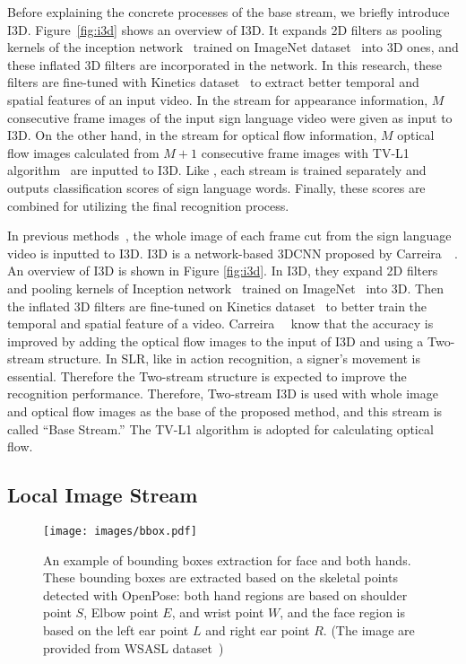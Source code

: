 \documentclass[journal]{IEEEtran}
\begin{document}
Before explaining the concrete processes of the base stream, we briefly introduce I3D. Figure~\ref{fig:i3d} shows an overview of I3D. It expands 2D filters as pooling kernels of the inception network~\cite{chris2014incep} trained on ImageNet dataset~\cite{olga2015imagenet} into 3D ones, and these inflated 3D filters are incorporated in the network.  In this research, these filters are fine-tuned with Kinetics dataset~\cite{joao2017i3d} to extract better temporal and spatial features of an input video. In the stream for appearance information, $M$ consecutive frame images of the input sign language video were given as input to I3D. On the other hand, in the stream for optical flow information, $M$ optical flow images calculated from $M+1$ consecutive frame images with TV-L1 algorithm~\cite{zach2007tvl1} are inputted to I3D. Like \cite{tu2018mscnn, bilen2018multi, zang2018multi}, each stream is trained separately and outputs classification scores of sign language words. Finally, these scores are combined for utilizing the final recognition process. 

In previous methods~\cite{li2020word,vaezi2019ms-asl}, the whole image of each frame cut from the sign language video is inputted to I3D. I3D is a network-based 3DCNN proposed by Carreira~\etal~\cite{joao2017i3d}. An overview of I3D is shown in Figure \ref{fig:i3d}. In I3D, they expand 2D filters and pooling kernels of Inception network~\cite{chris2014incep} trained on ImageNet~\cite{olga2015imagenet} into 3D. Then the inflated 3D filters are fine-tuned on Kinetics dataset~\cite{joao2017i3d} to better train the temporal and spatial feature of a video. Carreira~\etal~\cite{joao2017i3d} know that the accuracy is improved by adding the optical flow images to the input of I3D and using a Two-stream structure. In SLR, like in action recognition, a signer's movement is essential. Therefore the Two-stream structure is expected to improve the recognition performance. Therefore, Two-stream I3D is used with whole image and optical flow images as the base of the proposed method, and this stream is called ``Base Stream.'' The TV-L1 algorithm is adopted for calculating optical flow.
\fi




\subsection{Local Image Stream}

\begin{figure}[tb]
  \centering
    \texttt{[image: images/bbox.pdf]}
    \caption{An example of bounding boxes extraction for face and both hands.
    These bounding boxes are extracted based on the skeletal points detected with OpenPose: 
    both hand regions are based on shoulder point $S$, Elbow point $E$, and wrist point $W$, and the face region is based on the left ear point $L$ and right ear point $R$. 
    (The image are provided from WSASL dataset~\cite{li2020word})}
    \label{fig:bbox}
\end{figure}
\end{document}
